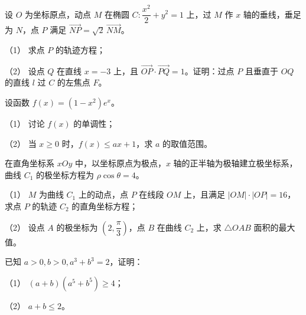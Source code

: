 \begin{question}
设 \(O\) 为坐标原点，动点 \(M\) 在椭圆 \(C:\dfrac{x^2}{2}+y^2=1\) 上，过 \(M\) 作 \(x\) 轴的垂线，垂足为 \(N\)，点 \(P\) 满足 \(\overrightarrow{NP}=\sqrt2\,\overrightarrow{NM}\)。

（1） 求点 \(P\) 的轨迹方程；

（2） 设点 \(Q\) 在直线 \(x=-3\) 上，且 \(\overrightarrow{OP}\cdot\overrightarrow{PQ}=1\)。证明：过点 \(P\) 且垂直于 \(OQ\) 的直线 \(l\) 过 \(C\) 的左焦点 \(F\)。

\end{question}
\begin{question}
设函数 \(f(x)=(1-x^2)e^x\)。

（1） 讨论 \(f(x)\) 的单调性；

（2） 当 \(x\ge0\) 时，\(f(x)\le ax+1\)，求 \(a\) 的取值范围。

\end{question}
\begin{question}
在直角坐标系 \(xOy\) 中，以坐标原点为极点，\(x\) 轴的正半轴为极轴建立极坐标系，曲线 \(C_1\) 的极坐标方程为 \(\rho\cos\theta=4\)。

（1） \(M\) 为曲线 \(C_1\) 上的动点，点 \(P\) 在线段 \(OM\) 上，且满足 \(|OM|\cdot|OP|=16\)，求点 \(P\) 的轨迹 \(C_2\) 的直角坐标方程；

（2） 设点 \(A\) 的极坐标为 \(\left(2,\dfrac{\pi}{3}\right)\)，点 \(B\) 在曲线 \(C_2\) 上，求 \(\triangle OAB\) 面积的最大值。

\end{question}
\begin{question}
已知 \(a>0,b>0,a^3+b^3=2\)，证明：

（1） \((a+b)(a^5+b^5)\ge4\)；

（2） \(a+b\le2\)。

\end{question}
